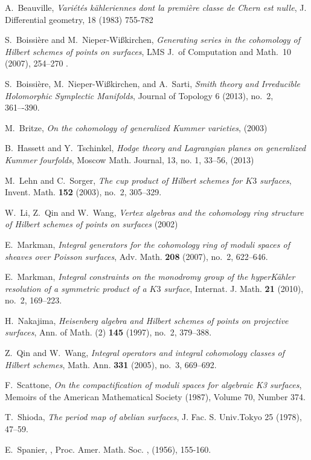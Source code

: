 \documentclass{amsart}
\theoremstyle{plain}
\theoremstyle{definition}
\theoremstyle{remark}
\begin{document}

\begin{thebibliography}{10}

A.~Beauville, \emph{Vari\'et\'es k\"ahleriennes dont la premi\`ere classe de Chern est nulle}, 
  J. Differential geometry, 18 (1983) 755-782

S.~Boissi\`ere and M.~Nieper-Wi{\ss}kirchen, \emph{Generating series in the cohomology 
  of Hilbert schemes of points on surfaces}, LMS J.~of Computation and Math.~10 (2007), 254--270 .

S.~Boissi\`ere, M.~Nieper-Wi{\ss}kirchen, and A.~Sarti, \emph{Smith theory and 
  Irreducible Holomorphic Symplectic Manifolds}, Journal of Topology 6 (2013), no.~2, 361–-390.

M.~Britze, \emph{On the cohomology of generalized Kummer varieties}, (2003) 

B.~Hassett and Y.~Tschinkel, \emph{ Hodge theory and Lagrangian planes on 
  generalized Kummer fourfolds}, Moscow Math. Journal, 13, no. 1, 33--56, (2013) 
  
M.~Lehn and C.~Sorger, \emph{The cup product of {H}ilbert schemes for {$K3$}
  surfaces}, Invent. Math. \textbf{152} (2003), no.~2, 305--329.

W.~Li, Z.~Qin and W.~Wang, \emph{Vertex algebras and the cohomology ring structure of 
  Hilbert schemes of points on surfaces} (2002)

E.~Markman, \emph{Integral generators for the cohomology ring of moduli spaces of
  sheaves over {P}oisson surfaces}, Adv. Math. \textbf{208} (2007), no.~2,
  622--646.

E.~Markman, \emph{Integral constraints on the monodromy group of the
  hyper{K}\"ahler resolution of a symmetric product of a {$K3$} surface},
  Internat. J. Math. \textbf{21} (2010), no.~2, 169--223.

H.~Nakajima, \emph{Heisenberg algebra and {H}ilbert schemes of points on
  projective surfaces}, Ann. of Math. (2) \textbf{145} (1997), no.~2, 379--388.

Z.~Qin and W.~Wang, \emph{Integral operators and integral cohomology classes of
  {H}ilbert schemes}, Math. Ann. \textbf{331} (2005), no.~3, 669--692.

F.~Scattone, \emph{On the compactification of moduli spaces for algebraic K3 surfaces},
  Memoirs of the American Mathematical Society (1987), Volume 70, Number 374.

T.~Shioda, \emph{The period map of abelian surfaces}, J. Fac. S. Univ.Tokyo 25 (1978), 47--59.

E.~Spanier, 
,
\newblock Proc. Amer. Math. Soc.
, (1956), 155-160.

\end{thebibliography}
\end{document}
